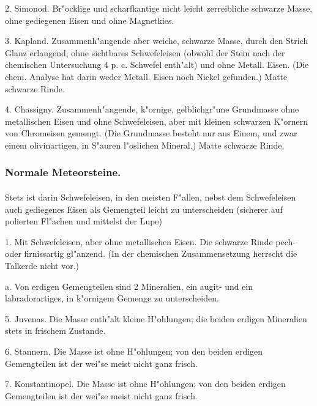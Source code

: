 \documentclass[a4paper, 11pt, oneside, polutonikogreek, german]{article}
\begin{document}
2. Simonod. Br"ocklige und scharfkantige nicht leicht zerreibliche schwarze Masse, ohne gediegenen Eisen und ohne Magnetkies.

3. Kapland. Zusammenh"angende aber weiche, schwarze Masse, durch den Strich Glanz erlangend, ohne sichtbares Schwefeleisen (obwohl der Stein nach der chemischen Untersuchung 4 p. c. Schwefel enth"alt) und ohne Metall. Eisen. (Die chem. Analyse hat darin weder Metall. Eisen noch Nickel gefunden.) Matte schwarze Rinde.

4. Chassigny. Zusammenh"angende, k"ornige, gelblichgr"une Grundmasse ohne metallischen Eisen und ohne Schwefeleisen, aber mit kleinen schwarzen K"ornern von Chromeisen gemengt. (Die Grundmasse besteht nur aus Einem, und zwar einem olivinartigen, in S"auren l"oslichen Mineral.) Matte schwarze Rinde.
\subsubsection{Normale Meteorsteine.}
\paragraph{}
Stets ist darin Schwefeleisen, in den meisten F"allen, nebst dem Schwefeleisen auch gediegenes Eisen als Gemengteil leicht zu unterscheiden (sicherer auf polierten Fl"achen und mittelst der Lupe)

\vspace{2ex}

1. Mit Schwefeleisen, aber ohne metallischen Eisen. Die schwarze Rinde pech- oder firnissartig gl"anzend. (In der chemischen Zusammensetzung herrscht die Talkerde nicht vor.)

\vspace{2ex}

\hspace*{10mm}a. Von erdigen Gemengteilen sind 2 Mineralien, ein augit- und ein labradorartiges, in k"ornigem Gemenge zu unterscheiden.

\hspace*{15mm}5. Juvenas. Die Masse enth"alt kleine H"ohlungen; die beiden erdigen Mineralien stets in frischem Zustande.

\hspace*{15mm}6. Stannern. Die Masse ist ohne H"ohlungen; von den beiden erdigen Gemengteilen ist der wei"se meist nicht ganz frisch.

\hspace*{15mm}7. Konstantinopel. Die Masse ist ohne H"ohlungen; von den beiden erdigen Gemengteilen ist der wei"se meist nicht ganz frisch.
\end{document}
